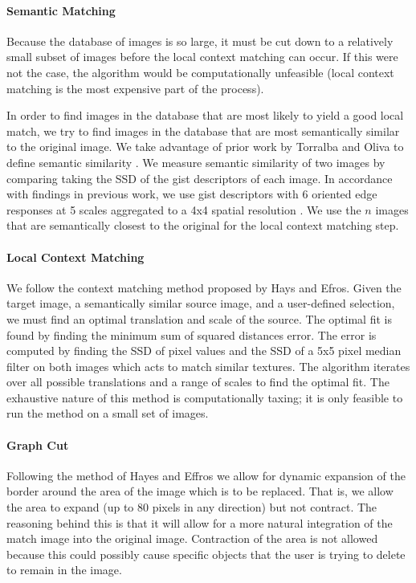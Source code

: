 \documentclass[11pt]{amsart}
\begin{document}
\paragraph{\sc Semantic Matching} 

Because the database of images is so large, it must be cut down to a relatively small subset of images before the local context matching can occur. If this were not the case, the algorithm would be computationally unfeasible (local context matching is the most expensive part of the process). 

In order to find images in the database that are most likely to yield a good local match, we try to find images in the database that are most semantically similar to the original image. We take advantage of prior work by Torralba and Oliva to define semantic similarity \cite{Torralba:2006}. We measure semantic similarity of two images by comparing taking the SSD of the gist descriptors of each image. In accordance with findings in previous work, we use gist descriptors with 6 oriented edge responses at 5 scales aggregated to a
4x4 spatial resolution \cite{Hays:2007}. We use the $n$ images that are semantically closest to the original
for the local context matching step. 

\paragraph{\sc Local Context Matching}


We follow the context matching method proposed by Hays and Efros.\cite{Hays:2007} Given the target image, a semantically similar source image, and a user-defined selection, we must find an optimal translation and scale of the source. The optimal fit is found by finding the minimum sum of squared distances error. The error is computed by finding the SSD of pixel values and the SSD of a 5x5 pixel median filter on both images which acts to match similar textures. The algorithm iterates over all possible translations and a range of scales to find the optimal fit. The exhaustive nature of this method is computationally taxing; it is only feasible to run the method on a small set of images.


\paragraph{\sc Graph Cut}

Following the method of Hayes and Effros \cite{Hays:2007} we allow for dynamic expansion of the border around the area of the image which is to be replaced. That is, we allow the area to expand (up to 80 pixels in any direction) but not contract. The reasoning behind this is that it will allow for a more natural integration of the match image into the original image. Contraction of the area is not allowed because this could possibly cause specific objects that the user is trying to delete to remain in the image. 
\end{document}
